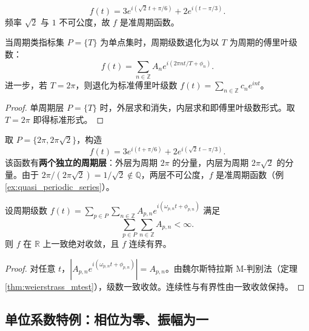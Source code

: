 \begin{example}[准周期的周期级数]\label{ex:quasi_periodic_series}
\[
f(t) = 3 e^{i(\sqrt{2}\,t + \pi/6)} + 2 e^{i(t - \pi/3)}.
\]
频率 $\sqrt{2}$ 与 $1$ 不可公度，故 $f$ 是准周期函数。
\end{example}

\begin{property}[周期级数的傅里叶级数退化]\label{prop:periodic_series_degeneration}
当周期类指标集 $P = \{T\}$ 为单点集时，周期级数退化为以 $T$ 为周期的傅里叶级数：
\[
f(t) = \sum_{n \in \mathbb{Z}} A_n e^{i(2\pi n t / T + \phi_n)}.
\]
进一步，若 $T = 2\pi$，则退化为标准傅里叶级数 $f(t) = \sum_{n \in \mathbb{Z}} c_n e^{int}$。
\end{property}

\begin{proof}
单周期层 $P = \{T\}$ 时，外层求和消失，内层求和即傅里叶级数形式。取 $T = 2\pi$ 即得标准形式。
\end{proof}

\begin{example}[双周期层的周期级数]\label{ex:two_period_layers}
取 $P = \{2\pi, 2\pi\sqrt{2}\}$，构造
\[
f(t) = 3 e^{i(t + \pi/6)} + 2 e^{i(\sqrt{2}\,t - \pi/3)}.
\]
该函数有\textbf{两个独立的周期层}：外层为周期 $2\pi$ 的分量，内层为周期 $2\pi\sqrt{2}$ 的分量。由于 $2\pi/(2\pi\sqrt{2}) = 1/\sqrt{2} \notin \mathbb{Q}$，两层不可公度，$f$ 是准周期函数（例 \ref{ex:quasi_periodic_series}）。
\end{example}

\begin{theorem}[周期级数收敛的充分条件]\label{thm:periodic_series_convergence}
设周期级数 $f(t) = \sum_{p \in P} \sum_{n \in \mathbb{Z}} A_{p,n} e^{i(\omega_{p,n} t + \phi_{p,n})}$ 满足
\[
\sum_{p \in P} \sum_{n \in \mathbb{Z}} A_{p,n} < \infty.
\]
则 $f$ 在 $\mathbb{R}$ 上一致绝对收敛，且 $f$ 连续有界。
\end{theorem}

\begin{proof}
对任意 $t$，$|A_{p,n} e^{i(\omega_{p,n} t + \phi_{p,n})}| = A_{p,n}$。由魏尔斯特拉斯 M-判别法（定理 \ref{thm:weierstrass_mtest}），级数一致收敛。连续性与有界性由一致收敛保持。
\end{proof}

\subsection{\texorpdfstring{单位系数特例：相位为零、振幅为一}{单位系数特例：相位为零、振幅为一}}

